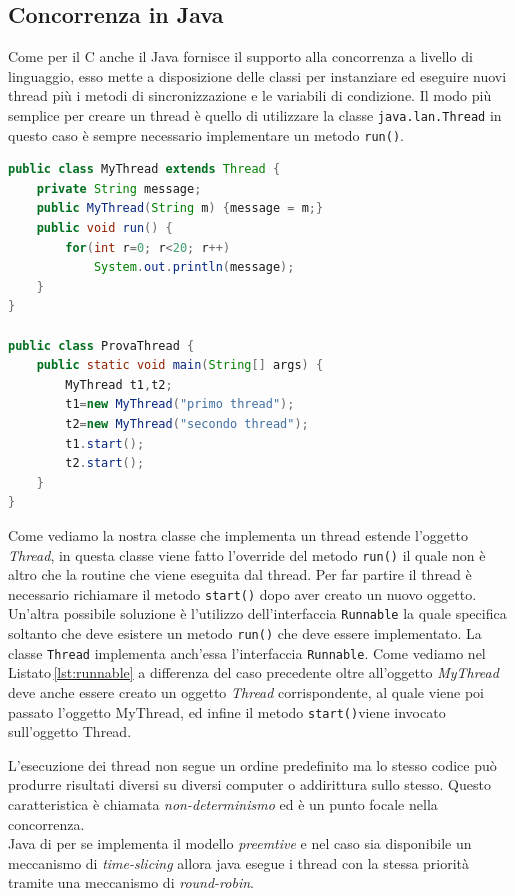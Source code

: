 \subsection{Concorrenza in Java}
Come per il C anche il Java fornisce il supporto alla concorrenza a livello di linguaggio, esso mette a disposizione delle classi per instanziare ed eseguire nuovi thread più i metodi di sincronizzazione e le variabili di condizione.
Il modo più semplice per creare un thread è quello di utilizzare la classe \texttt{java.lan.Thread} in questo caso è sempre necessario implementare un metodo \texttt{run()}.
\begin{lstlisting}[language=Java,caption={Uso della classe Thread in Java},label=lst:jthread]
public class MyThread extends Thread {
	private String message;
	public MyThread(String m) {message = m;}
	public void run() {
		for(int r=0; r<20; r++)
			System.out.println(message);
	}
}

public class ProvaThread {
	public static void main(String[] args) {
		MyThread t1,t2;
		t1=new MyThread("primo thread");
		t2=new MyThread("secondo thread");
		t1.start();
		t2.start();
	}
}
\end{lstlisting}
Come vediamo la nostra classe che implementa un thread estende l'oggetto \emph{Thread}, in questa classe viene fatto l'override del metodo \texttt{run()} il quale non è altro che la routine che viene eseguita dal thread. Per far partire il thread è necessario richiamare il metodo \texttt{start()} dopo aver creato un nuovo oggetto.\\
Un'altra possibile soluzione è l'utilizzo dell'interfaccia \texttt{Runnable} la quale specifica soltanto che deve esistere un metodo \texttt{run()} che deve essere implementato. La classe \texttt{Thread} implementa anch'essa l'interfaccia \texttt{Runnable}.
Come vediamo nel Listato\,\ref{lst:runnable} a differenza del caso precedente oltre all'oggetto \emph{MyThread} deve anche essere creato un oggetto \emph{Thread} corrispondente, al quale viene poi passato l'oggetto MyThread, ed infine il metodo \texttt{start()}viene invocato sull'oggetto Thread.

L'esecuzione dei thread non segue un ordine predefinito ma lo stesso codice può produrre risultati diversi su diversi computer o addirittura sullo stesso. Questo caratteristica è chiamata \emph{non-determinismo} ed è un punto focale nella concorrenza.\\
Java di per se implementa il modello \emph{preemtive} e nel caso sia disponibile un meccanismo di \emph{time-slicing} allora java esegue i thread con la stessa priorità tramite una meccanismo di \emph{round-robin}.\\
